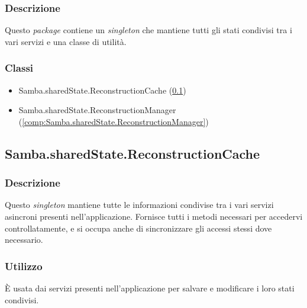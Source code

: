 \subsubsection{Descrizione}
Questo \emph{package} contiene un \emph{singleton} che mantiene tutti gli stati condivisi tra i vari servizi e una classe di utilità.
\subsubsection{Classi}
\begin{itemize}
	\item Samba.sharedState.ReconstructionCache (\ref{comp:Samba.sharedState.ReconstructionCache})
	\item Samba.sharedState.ReconstructionManager (\ref{comp:Samba.sharedState.ReconstructionManager})
\end{itemize}

\subsection{Samba.sharedState.ReconstructionCache}\label{comp:Samba.sharedState.ReconstructionCache}
\subsubsection{Descrizione}
Questo \emph{singleton} mantiene tutte le informazioni condivise tra i vari servizi asincroni presenti nell'applicazione. Fornisce tutti i metodi necessari per accedervi controllatamente, e si occupa anche di sincronizzare gli accessi stessi dove necessario.
\subsubsection{Utilizzo}
È usata dai servizi presenti nell'applicazione per salvare e modificare i loro stati condivisi.
